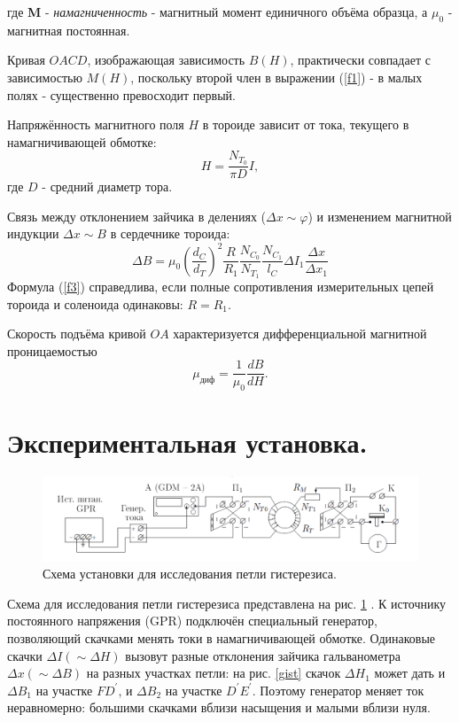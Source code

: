 \documentclass[a4paper, 12pt, twoside]{article}
\begin{document}
где \textbf{M} - \textit{намагниченность} - магнитный момент единичного объёма образца, а $\mu_0$ - магнитная постоянная.

Кривая $OACD$, изображающая зависимость $B(H)$, практически совпадает с зависимостью $M(H)$, поскольку второй член в выражении (\ref{f1}) - в малых полях - существенно превосходит первый.

Напряжённость магнитного поля $H$ в тороиде зависит от тока, текущего в намагничивающей обмотке:
\begin{equation}
H = \dfrac{N_{T_0}}{\pi D}I,
\label{f2}
\end{equation}
где $D$ - средний диаметр тора.

Связь между отклонением зайчика в делениях ($\Delta x \sim \varphi$) и изменением магнитной индукции $\Delta x \sim B$ в сердечнике тороида:
\begin{equation}
\Delta B = \mu_0 \left (\dfrac{d_C}{d_T}\right )^2 \dfrac{R}{R_1} \dfrac{N_{C_0}}{N_{T_1}}\dfrac{N_{C_1}}{l_C}\Delta I_1 \dfrac{\Delta x}{\Delta x_1}
\label{f3}
\end{equation}
Формула (\ref{f3}) справедлива, если полные сопротивления измерительных цепей тороида и соленоида одинаковы: $R = R_1$.



Скорость подъёма кривой $OA$ характеризуется дифференциальной магнитной проницаемостью
\begin{equation}
\mu_{\text{диф}} = \dfrac{1}{\mu_0}\dfrac{dB}{dH}.
\end{equation}


\section{Экспериментальная установка.}

\begin{figure}[H]
	\centering
	\includegraphics[width = \textwidth]{schem}
	\caption{Схема установки для исследования петли гистерезиса.}
	\label{schem}
\end{figure}

Схема для исследования петли гистерезиса представлена на рис. \ref{schem} . К источнику постоянного напряжения (GPR) подключён специальный генератор, позволяющий скачками менять токи в намагничивающей обмотке. Одинаковые скачки $\Delta I (\sim \Delta H)$ вызовут разные отклонения зайчика гальванометра $\Delta x (\sim \Delta B)$ на разных участках петли: на рис. \ref{gist} скачок $\Delta H_1$ может дать и $\Delta B_1$ на участке $FD^{'}$, и $\Delta B_2$ на участке $D^{'}E^{'}$. Поэтому генератор меняет ток неравномерно: большими скачками вблизи насыщения и малыми вблизи нуля.
\end{document}
